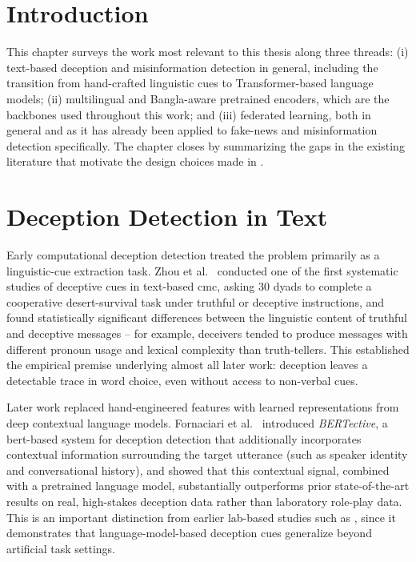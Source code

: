 \section{Introduction}

This chapter surveys the work most relevant to this thesis along three threads: (i) text-based deception and misinformation detection in general, including the transition from hand-crafted linguistic cues to Transformer-based language models; (ii) multilingual and Bangla-aware pretrained encoders, which are the backbones used throughout this work; and (iii) federated learning, both in general and as it has already been applied to fake-news and misinformation detection specifically. The chapter closes by summarizing the gaps in the existing literature that motivate the design choices made in .

\section{Deception Detection in Text}

Early computational deception detection treated the problem primarily as a linguistic-cue extraction task. Zhou et al.\ \cite{zhou2003exploratory} conducted one of the first systematic studies of deceptive cues in text-based \gls{cmc}, asking 30 dyads to complete a cooperative desert-survival task under truthful or deceptive instructions, and found statistically significant differences between the linguistic content of truthful and deceptive messages -- for example, deceivers tended to produce messages with different pronoun usage and lexical complexity than truth-tellers. This established the empirical premise underlying almost all later work: deception leaves a detectable trace in word choice, even without access to non-verbal cues.

Later work replaced hand-engineered features with learned representations from deep contextual language models. Fornaciari et al.\ \cite{fornaciari2021bertective} introduced \emph{BERTective}, a \gls{bert}-based system for deception detection that additionally incorporates contextual information surrounding the target utterance (such as speaker identity and conversational history), and showed that this contextual signal, combined with a pretrained language model, substantially outperforms prior state-of-the-art results on real, high-stakes deception data rather than laboratory role-play data. This is an important distinction from earlier lab-based studies such as \cite{zhou2003exploratory}, since it demonstrates that language-model-based deception cues generalize beyond artificial task settings.

